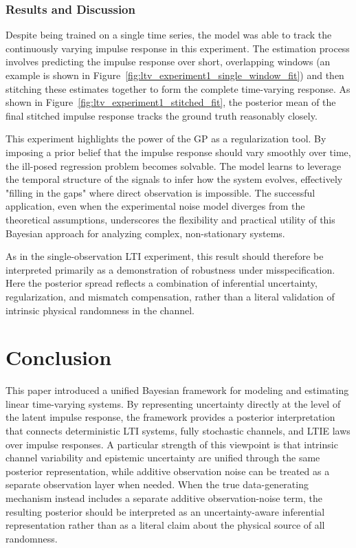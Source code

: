 \documentclass[preprint,1p,times,authoryear]{elsarticle}
\begin{document}
\subsubsection{Results and Discussion}

Despite being trained on a single time series, the model was able to track the continuously varying impulse response in this experiment. The estimation process involves predicting the impulse response over short, overlapping windows (an example is shown in Figure~\ref{fig:ltv_experiment1_single_window_fit}) and then stitching these estimates together to form the complete time-varying response. As shown in Figure~\ref{fig:ltv_experiment1_stitched_fit}, the posterior mean of the final stitched impulse response tracks the ground truth reasonably closely.

This experiment highlights the power of the GP as a regularization tool. By imposing a prior belief that the impulse response should vary smoothly over time, the ill-posed regression problem becomes solvable. The model learns to leverage the temporal structure of the signals to infer how the system evolves, effectively "filling in the gaps" where direct observation is impossible. The successful application, even when the experimental noise model diverges from the theoretical assumptions, underscores the flexibility and practical utility of this Bayesian approach for analyzing complex, non-stationary systems.

As in the single-observation LTI experiment, this result should therefore be interpreted primarily as a demonstration of robustness under misspecification. Here the posterior spread reflects a combination of inferential uncertainty, regularization, and mismatch compensation, rather than a literal validation of intrinsic physical randomness in the channel.

\section{Conclusion}

This paper introduced a unified Bayesian framework for modeling and estimating linear time-varying systems. By representing uncertainty directly at the level of the latent impulse response, the framework provides a posterior interpretation that connects deterministic LTI systems, fully stochastic channels, and LTIE laws over impulse responses. A particular strength of this viewpoint is that intrinsic channel variability and epistemic uncertainty are unified through the same posterior representation, while additive observation noise can be treated as a separate observation layer when needed. When the true data-generating mechanism instead includes a separate additive observation-noise term, the resulting posterior should be interpreted as an uncertainty-aware inferential representation rather than as a literal claim about the physical source of all randomness.
\end{document}
